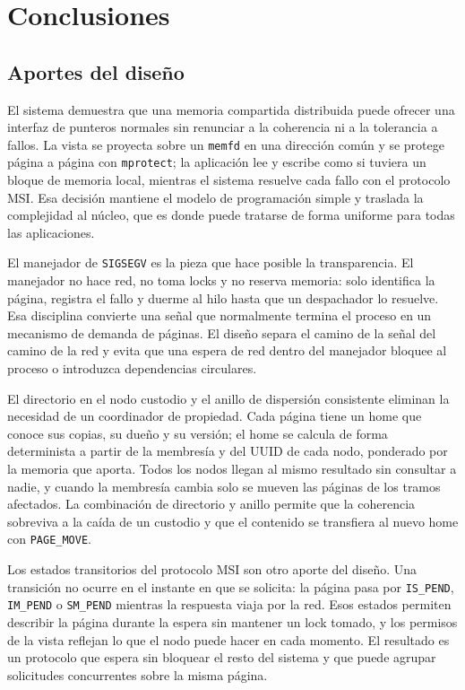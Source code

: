 \section{Conclusiones}\label{sec:conclusiones}

\subsection{Aportes del diseño}

El sistema demuestra que una memoria compartida distribuida puede ofrecer una interfaz de punteros normales sin renunciar a la coherencia ni a la tolerancia a fallos. La vista se proyecta sobre un \texttt{memfd} en una dirección común y se protege página a página con \texttt{mprotect}; la aplicación lee y escribe como si tuviera un bloque de memoria local, mientras el sistema resuelve cada fallo con el protocolo MSI. Esa decisión mantiene el modelo de programación simple y traslada la complejidad al núcleo, que es donde puede tratarse de forma uniforme para todas las aplicaciones.

El manejador de \texttt{SIGSEGV} es la pieza que hace posible la transparencia. El manejador no hace red, no toma locks y no reserva memoria: solo identifica la página, registra el fallo y duerme al hilo hasta que un despachador lo resuelve. Esa disciplina convierte una señal que normalmente termina el proceso en un mecanismo de demanda de páginas. El diseño separa el camino de la señal del camino de la red y evita que una espera de red dentro del manejador bloquee al proceso o introduzca dependencias circulares.

El directorio en el nodo custodio y el anillo de dispersión consistente eliminan la necesidad de un coordinador de propiedad. Cada página tiene un home que conoce sus copias, su dueño y su versión; el home se calcula de forma determinista a partir de la membresía y del UUID de cada nodo, ponderado por la memoria que aporta. Todos los nodos llegan al mismo resultado sin consultar a nadie, y cuando la membresía cambia solo se mueven las páginas de los tramos afectados. La combinación de directorio y anillo permite que la coherencia sobreviva a la caída de un custodio y que el contenido se transfiera al nuevo home con \texttt{PAGE\_MOVE}.

Los estados transitorios del protocolo MSI son otro aporte del diseño. Una transición no ocurre en el instante en que se solicita: la página pasa por \texttt{IS\_PEND}, \texttt{IM\_PEND} o \texttt{SM\_PEND} mientras la respuesta viaja por la red. Esos estados permiten describir la página durante la espera sin mantener un lock tomado, y los permisos de la vista reflejan lo que el nodo puede hacer en cada momento. El resultado es un protocolo que espera sin bloquear el resto del sistema y que puede agrupar solicitudes concurrentes sobre la misma página.

